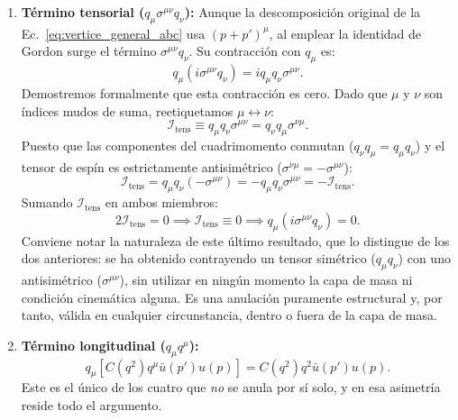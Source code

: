 \documentclass[10pt,a4paper]{article}
\begin{document}
\begin{enumerate}
    \item \textbf{Término tensorial ($q_\mu \sigma^{\mu\nu} q_\nu$):}
    Aunque la descomposición original de la Ec.~\eqref{eq:vertice_general_abc} usa $(p+p')^\mu$, al emplear la identidad de Gordon surge el término $\sigma^{\mu\nu} q_\nu$. Su contracción con $q_\mu$ es:
    \begin{equation}
    q_\mu (i \sigma^{\mu\nu} q_\nu) = i q_\mu q_\nu \sigma^{\mu\nu}.
    \end{equation}
    Demostremos formalmente que esta contracción es cero. Dado que $\mu$ y $\nu$ son índices mudos de suma, reetiquetamos $\mu \leftrightarrow \nu$:
    \begin{equation}
    \mathcal{I}_{\text{tens}} \equiv q_\mu q_\nu \sigma^{\mu\nu} = q_\nu q_\mu \sigma^{\nu\mu}.
    \end{equation}
    Puesto que las componentes del cuadrimomento conmutan ($q_\nu q_\mu = q_\mu q_\nu$) y el tensor de espín es estrictamente antisimétrico ($\sigma^{\nu\mu} = -\sigma^{\mu\nu}$):
    \begin{equation}
    \mathcal{I}_{\text{tens}} = q_\mu q_\nu (-\sigma^{\mu\nu}) = - q_\mu q_\nu \sigma^{\mu\nu} = - \mathcal{I}_{\text{tens}}.
    \end{equation}
    Sumando $\mathcal{I}_{\text{tens}}$ en ambos miembros:
    \begin{equation}
    2 \mathcal{I}_{\text{tens}} = 0 \implies \mathcal{I}_{\text{tens}} \equiv 0 \implies q_\mu (i \sigma^{\mu\nu} q_\nu) = 0.
    \end{equation}
    Conviene notar la naturaleza de este último resultado, que lo distingue de los dos anteriores: se ha obtenido contrayendo un tensor simétrico ($q_\mu q_\nu$) con uno antisimétrico ($\sigma^{\mu\nu}$), sin utilizar en ningún momento la capa de masa ni condición cinemática alguna. Es una anulación puramente estructural y, por tanto, válida en cualquier circunstancia, dentro o fuera de la capa de masa.

    \item \textbf{Término longitudinal ($q_\mu q^\mu$):}
    \begin{equation}
    q_\mu [C(q^2) q^\mu \bar{u}(p') u(p)] = C(q^2) q^2 \bar{u}(p') u(p).
    \end{equation}
    Este es el único de los cuatro que \emph{no} se anula por sí solo, y en esa asimetría reside todo el argumento.
\end{enumerate}
\end{document}
